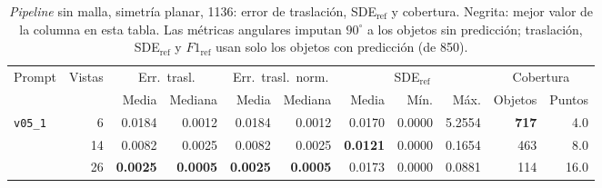 \begin{table}[htbp]
\centering
\caption{\textit{Pipeline} sin malla, simetría planar, 1136: error de traslación, SDE$_{\mathrm{ref}}$ y cobertura. Negrita: mejor valor de la columna en esta tabla. Las métricas angulares imputan $90^\circ$ a los objetos sin predicción; traslación, SDE$_{\mathrm{ref}}$ y $F1_{\mathrm{ref}}$ usan solo los objetos con predicción (de 850).}
\label{tab:plane_1136_posicion}
\begin{adjustbox}{max width=\textwidth}
\begin{tabular}{lrrrrrrrrrr}
\toprule
\multirow{2}{*}{Prompt} & \multirow{2}{*}{Vistas} & \multicolumn{2}{c}{Err.\ trasl.} & \multicolumn{2}{c}{Err.\ trasl.\ norm.} & \multicolumn{3}{c}{SDE$_{\mathrm{ref}}$} & \multicolumn{2}{c}{Cobertura} \\
\cmidrule(lr){3-4} \cmidrule(lr){5-6} \cmidrule(lr){7-9} \cmidrule(lr){10-11}
 &  & Media & Mediana & Media & Mediana & Media & Mín. & Máx. & Objetos & Puntos \\
\midrule
\multirow{3}{*}{\texttt{v05\_1}} & 6 & 0.0184 & 0.0012 & 0.0184 & 0.0012 & 0.0170 & 0.0000 & 5.2554 & \textbf{717} & 4.0 \\
 & 14 & 0.0082 & 0.0025 & 0.0082 & 0.0025 & \textbf{0.0121} & 0.0000 & 0.1654 & 463 & 8.0 \\
 & 26 & \textbf{0.0025} & \textbf{0.0005} & \textbf{0.0025} & \textbf{0.0005} & 0.0173 & 0.0000 & 0.0881 & 114 & 16.0 \\
\bottomrule
\end{tabular}
\end{adjustbox}
\end{table}

